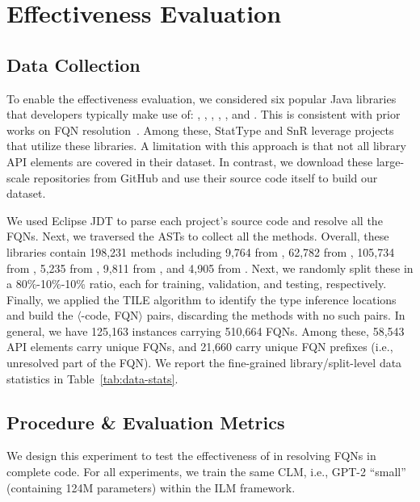 \section{Effectiveness Evaluation}
\label{sec:effectiveness-eval}

\subsection{Data Collection}\label{sec:effectiveness-data}



To enable the effectiveness evaluation, we considered six popular Java libraries that developers typically make use of: , , , , , and . This is consistent with prior works on FQN resolution~\cite{icse18, snr-icse22, prompt-ase22}. Among these, StatType\cite{icse18} and SnR\cite{snr-icse22} leverage projects that utilize these libraries. A limitation with this approach is that not all library API elements are covered in their dataset. In contrast, we download these large-scale repositories from GitHub and use their source code itself to build our dataset.

We used Eclipse JDT to parse each project’s source code and resolve all the FQNs. Next, we traversed the ASTs to collect all the methods. Overall, these libraries contain 198,231 methods including 9,764 from , 62,782 from , 105,734 from , 5,235 from , 9,811 from , and 4,905 from . Next, we randomly split these in a 80\%-10\%-10\% ratio, each for training, validation, and testing, respectively. Finally, we applied the TILE algorithm to identify the type inference locations and build the $\langle$\blank-code, FQN$\rangle$ pairs, discarding the methods with no such pairs. In general, we have 125,163 instances carrying 510,664 FQNs. Among these, 58,543 API elements carry unique FQNs, and 21,660 carry unique FQN prefixes (i.e., unresolved part of the FQN). We report the fine-grained library/split-level data statistics in Table~\ref{tab:data-stats}.

\subsection{Procedure \& Evaluation Metrics}\label{sec:effectiveness-eval-proc}
We design this experiment to test the effectiveness of \tool in resolving FQNs in complete code. For all experiments, we train the same CLM, i.e., GPT-2 “small” (containing 124M parameters) within the ILM framework.

